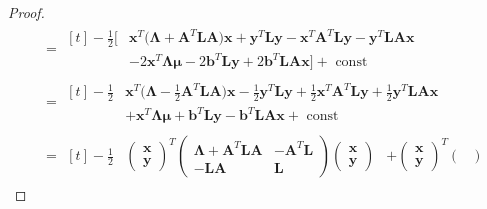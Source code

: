 \begin{proof}
\begin{equation*}
\begin{aligned}
        &= \begin{aligned}[t]
        -\frac{1}{2}\Big[&\boldsymbol x^T\Big(\boldsymbol \Lambda + \boldsymbol A^T \boldsymbol L\boldsymbol A\Big)\boldsymbol x 
        + \boldsymbol y^T\boldsymbol L \boldsymbol y 
        - \boldsymbol x^T\boldsymbol A^T \boldsymbol L\boldsymbol y 
        -\boldsymbol y^T\boldsymbol L\boldsymbol A\boldsymbol x  \\
        &- 2\boldsymbol x^T\boldsymbol \Lambda\boldsymbol \mu
        - 2\boldsymbol b^T\boldsymbol L\boldsymbol y  
        + 2\boldsymbol b^T\boldsymbol L\boldsymbol A\boldsymbol x \Big]
        + \text{ const }
        \end{aligned} \\ 
        &= \begin{aligned}[t]
        -\frac{1}{2}&\boldsymbol x^T\Big(\boldsymbol \Lambda -\frac{1}{2} \boldsymbol A^T \boldsymbol L\boldsymbol A\Big)\boldsymbol x 
        -\frac{1}{2} \boldsymbol y^T\boldsymbol L \boldsymbol y 
        +\frac{1}{2} \boldsymbol x^T\boldsymbol A^T \boldsymbol L\boldsymbol y 
        +\frac{1}{2}\boldsymbol y^T\boldsymbol L\boldsymbol A\boldsymbol x  \\
        &+\boldsymbol x^T\boldsymbol \Lambda\boldsymbol \mu
        +\boldsymbol b^T\boldsymbol L\boldsymbol y  
        -\boldsymbol b^T\boldsymbol L\boldsymbol A\boldsymbol x
        + \text{ const }
        \end{aligned} \\ 
        &= \begin{aligned}[t]
        -\frac{1}{2}&
        \begin{pmatrix}
            \boldsymbol x \\\boldsymbol y
        \end{pmatrix}^T
        \begin{pmatrix}
            \boldsymbol \Lambda + \boldsymbol A^T\boldsymbol L\boldsymbol A & - \boldsymbol A^T\boldsymbol L \\
            -\boldsymbol L\boldsymbol A & \boldsymbol L
        \end{pmatrix}
        \begin{pmatrix}
            \boldsymbol x \\\boldsymbol y
        \end{pmatrix}
        & + \begin{pmatrix}
            \boldsymbol x \\\boldsymbol y
        \end{pmatrix}^T
        \begin{pmatrix}

\end{pmatrix}
\end{aligned}
\end{aligned}
\end{equation*}
\end{proof}
